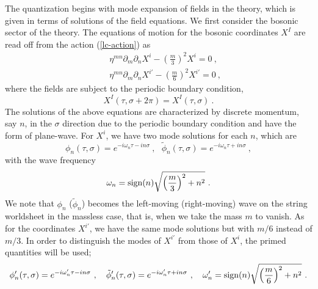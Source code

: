 \documentclass[a4paper,12pt]{article}
\begin{document}
The quantization begins with mode expansion of fields in the theory,
which is given in terms of solutions of the field equations.  We first
consider the bosonic sector of the theory.  The equations of motion
for the bosonic coordinates $X^I$ are read off from the action
(\ref{lc-action}) as
\begin{eqnarray}
& & \eta^{mn} \partial_m \partial_n X^i 
  - \left( \frac{m}{3} \right)^2 X^i = 0 ~,
                                    \nonumber \\
& & \eta^{mn} \partial_m \partial_n X^{i'} 
  - \left( \frac{m}{6} \right)^2 X^{i'} = 0~,
\label{beom}
\end{eqnarray}
where the fields are subject to the periodic boundary condition,
\begin{equation}
X^I (\tau, \sigma+2 \pi) = X^I (\tau, \sigma)~.
\end{equation}
The solutions of the above equations are characterized by discrete
momentum, say $n$, in the $\sigma$ direction due to the periodic
boundary condition and have the form of plane-wave.  For $X^i$, we
have two mode solutions for each $n$, which are
\begin{equation}
\phi_n (\tau, \sigma) = e^{-i \omega_n \tau - i n \sigma}~,~~~
\tilde{\phi}_n (\tau, \sigma) = e^{-i \omega_n \tau + i n \sigma}~,
\label{mode}
\end{equation}
with the wave frequency
\begin{equation}
\omega_n = {\rm sign}(n) 
      \sqrt{ \left( \frac{m}{3} \right)^2 + n^2 }~.
\end{equation}
We note that $\phi_n$ ($\tilde{\phi}_n$) becomes the left-moving
(right-moving) wave on the string worldsheet in the massless case,
that is, when we take the mass $m$ to vanish.  As for the coordinates
$X^{i'}$, we have the same mode solutions but with $m/6$ instead of
$m/3$.  In order to distinguish the modes of $X^{i'}$ from those of
$X^i$, the primed quantities will be used;
\begin{equation}
\phi'_n (\tau, \sigma) = e^{-i \omega'_n \tau - i n \sigma}~,~~~
\tilde{\phi}'_n (\tau, \sigma) 
  = e^{-i \omega'_n \tau + i n \sigma}~,~~~
\omega'_n = {\rm sign}(n) 
      \sqrt{ \left( \frac{m}{6} \right)^2 + n^2 }~.
\label{pmode}
\end{equation}
\end{document}
